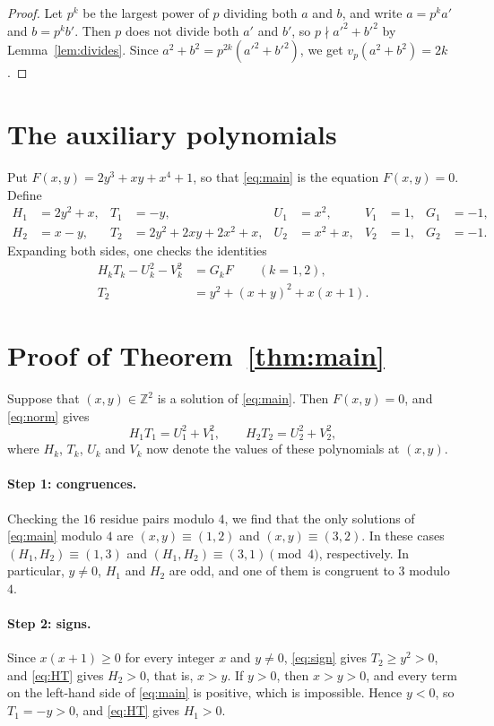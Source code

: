 \documentclass[11pt]{article}
\newcommand{\Z}{\mathbb{Z}}
\begin{document}
\begin{proof}
Let $p^k$ be the largest power of $p$ dividing both $a$ and $b$, and write $a=p^ka'$ and $b=p^kb'$. Then $p$ does not divide both $a'$ and $b'$, so $p\nmid a'^2+b'^2$ by Lemma~\ref{lem:divides}. Since $a^2+b^2=p^{2k}(a'^2+b'^2)$, we get $v_p(a^2+b^2)=2k$.
\end{proof}

\section{The auxiliary polynomials}

Put $F(x,y)=2y^3+xy+x^4+1$, so that \eqref{eq:main} is the equation $F(x,y)=0$. Define
\begin{align*}
H_1&=2y^2+x,& T_1&=-y,& U_1&=x^2,& V_1&=1,& G_1&=-1,\\
H_2&=x-y,& T_2&=2y^2+2xy+2x^2+x,& U_2&=x^2+x,& V_2&=1,& G_2&=-1.
\end{align*}
Expanding both sides, one checks the identities
\begin{align}
H_kT_k-U_k^2-V_k^2&=G_kF\qquad(k=1,2),\label{eq:norm}\\
T_2&=y^2+(x+y)^2+x(x+1).\label{eq:sign}
\end{align}

\section{Proof of Theorem~\ref{thm:main}}

Suppose that $(x,y)\in\Z^2$ is a solution of \eqref{eq:main}. Then $F(x,y)=0$, and \eqref{eq:norm} gives
\begin{equation}\label{eq:HT}
H_1T_1=U_1^2+V_1^2,\qquad H_2T_2=U_2^2+V_2^2,
\end{equation}
where $H_k$, $T_k$, $U_k$ and $V_k$ now denote the values of these polynomials at $(x,y)$.

\paragraph{Step 1: congruences.} Checking the $16$ residue pairs modulo $4$, we find that the only solutions of \eqref{eq:main} modulo $4$ are $(x,y)\equiv(1,2)$ and $(x,y)\equiv(3,2)$. In these cases $(H_1,H_2)\equiv(1,3)$ and $(H_1,H_2)\equiv(3,1)\pmod4$, respectively. In particular, $y\neq0$, $H_1$ and $H_2$ are odd, and one of them is congruent to $3$ modulo $4$.

\paragraph{Step 2: signs.} Since $x(x+1)\geq0$ for every integer $x$ and $y\neq0$, \eqref{eq:sign} gives $T_2\geq y^2>0$, and \eqref{eq:HT} gives $H_2>0$, that is, $x>y$. If $y>0$, then $x>y>0$, and every term on the left-hand side of \eqref{eq:main} is positive, which is impossible. Hence $y<0$, so $T_1=-y>0$, and \eqref{eq:HT} gives $H_1>0$.
\end{document}
